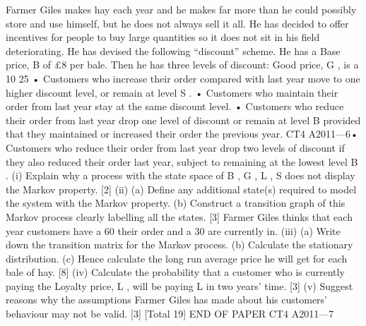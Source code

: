 \documentclass[a4paper,12pt]{article}
\begin{document}
\begin{enumerate}[1]
[Total 14]
Farmer Giles makes hay each year and he makes far more than he could possibly store
and use himself, but he does not always sell it all. He has decided to offer incentives
for people to buy large quantities so it does not sit in his field deteriorating. He has
devised the following “discount” scheme.
He has a Base price, B of £8 per bale. Then he has three levels of discount: Good
price, G , is a 10%
25%
• Customers who increase their order compared with last year move to one higher
discount level, or remain at level S .
• Customers who maintain their order from last year stay at the same discount level.
• Customers who reduce their order from last year drop one level of discount or
remain at level B provided that they maintained or increased their order the
previous year.
CT4 A2011—6•
Customers who reduce their order from last year drop two levels of discount if
they also reduced their order last year, subject to remaining at the lowest level B .
(i) Explain why a process with the state space of { B , G , L , S } does not display the
Markov property.
[2]
(ii) (a)
Define any additional state(s) required to model the system
with the Markov property.
(b)
Construct a transition graph of this Markov process clearly labelling
all the states.
[3]
Farmer Giles thinks that each year customers have a 60%
their order and a 30%
are currently in.
(iii)
(a) Write down the transition matrix for the Markov process.
(b) Calculate the stationary distribution.
(c) Hence calculate the long run average price he will get for each bale of
hay.
[8]
(iv) Calculate the probability that a customer who is currently paying the Loyalty
price, L , will be paying L in two years’ time.
[3]
(v) Suggest reasons why the assumptions Farmer Giles has made about his
customers’ behaviour may not be valid.
[3]
[Total 19]
END OF PAPER
CT4 A2011—7


\end{enumerate}
\end{document}
